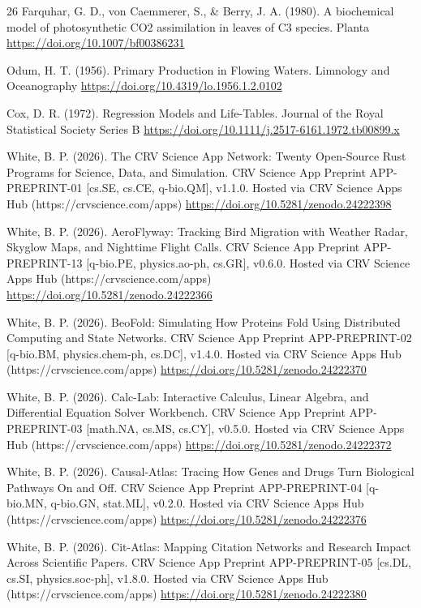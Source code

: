 \documentclass[10pt,letterpaper]{article}
\begin{document}
\begin{thebibliography}{26}
 Farquhar, G. D., von Caemmerer, S., \& Berry, J. A. (1980). A biochemical model of photosynthetic CO2 assimilation in leaves of C3 species. Planta \url{https://doi.org/10.1007/bf00386231}

 Odum, H. T. (1956). Primary Production in Flowing Waters. Limnology and Oceanography \url{https://doi.org/10.4319/lo.1956.1.2.0102}

 Cox, D. R. (1972). Regression Models and Life-Tables. Journal of the Royal Statistical Society Series B \url{https://doi.org/10.1111/j.2517-6161.1972.tb00899.x}

 White, B. P. (2026). The CRV Science App Network: Twenty Open-Source Rust Programs for Science, Data, and Simulation. CRV Science App Preprint APP-PREPRINT-01 [cs.SE, cs.CE, q-bio.QM], v1.1.0. Hosted via CRV Science Apps Hub (https://crvscience.com/apps) \url{https://doi.org/10.5281/zenodo.24222398}

 White, B. P. (2026). AeroFlyway: Tracking Bird Migration with Weather Radar, Skyglow Maps, and Nighttime Flight Calls. CRV Science App Preprint APP-PREPRINT-13 [q-bio.PE, physics.ao-ph, cs.GR], v0.6.0. Hosted via CRV Science Apps Hub (https://crvscience.com/apps) \url{https://doi.org/10.5281/zenodo.24222366}

 White, B. P. (2026). BeoFold: Simulating How Proteins Fold Using Distributed Computing and State Networks. CRV Science App Preprint APP-PREPRINT-02 [q-bio.BM, physics.chem-ph, cs.DC], v1.4.0. Hosted via CRV Science Apps Hub (https://crvscience.com/apps) \url{https://doi.org/10.5281/zenodo.24222370}

 White, B. P. (2026). Calc-Lab: Interactive Calculus, Linear Algebra, and Differential Equation Solver Workbench. CRV Science App Preprint APP-PREPRINT-03 [math.NA, cs.MS, cs.CY], v0.5.0. Hosted via CRV Science Apps Hub (https://crvscience.com/apps) \url{https://doi.org/10.5281/zenodo.24222372}

 White, B. P. (2026). Causal-Atlas: Tracing How Genes and Drugs Turn Biological Pathways On and Off. CRV Science App Preprint APP-PREPRINT-04 [q-bio.MN, q-bio.GN, stat.ML], v0.2.0. Hosted via CRV Science Apps Hub (https://crvscience.com/apps) \url{https://doi.org/10.5281/zenodo.24222376}

 White, B. P. (2026). Cit-Atlas: Mapping Citation Networks and Research Impact Across Scientific Papers. CRV Science App Preprint APP-PREPRINT-05 [cs.DL, cs.SI, physics.soc-ph], v1.8.0. Hosted via CRV Science Apps Hub (https://crvscience.com/apps) \url{https://doi.org/10.5281/zenodo.24222380}


\end{thebibliography}
\end{document}
